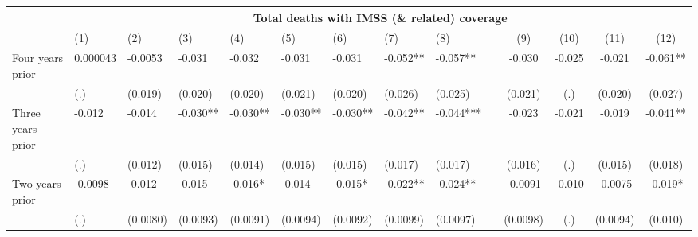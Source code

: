 \begin{tabular}{lccccrrrrrcccc}
\toprule
      & \multicolumn{13}{c}{Total deaths with IMSS (\& related) coverage } \\
\midrule
      & \multicolumn{1}{l}{(1)} & \multicolumn{1}{l}{(2)} & \multicolumn{1}{l}{(3)} & \multicolumn{1}{l}{(4)} & \multicolumn{1}{l}{(5)} & \multicolumn{1}{l}{(6)} & \multicolumn{1}{l}{(7)} & \multicolumn{1}{l}{(8)} &       & (9)   & (10)  & (11)  & (12) \\
\midrule
\midrule
Four years prior & \multicolumn{1}{l}{0.000043} & \multicolumn{1}{l}{-0.0053} & \multicolumn{1}{l}{-0.031} & \multicolumn{1}{l}{-0.032} & \multicolumn{1}{l}{-0.031} & \multicolumn{1}{l}{-0.031} & \multicolumn{1}{l}{-0.052**} & \multicolumn{1}{l}{-0.057**} &       & -0.030 & -0.025 & -0.021 & -0.061** \\
      & \multicolumn{1}{l}{(.)} & \multicolumn{1}{l}{(0.019)} & \multicolumn{1}{l}{(0.020)} & \multicolumn{1}{l}{(0.020)} & \multicolumn{1}{l}{(0.021)} & \multicolumn{1}{l}{(0.020)} & \multicolumn{1}{l}{(0.026)} & \multicolumn{1}{l}{(0.025)} &       & (0.021) & (.)   & (0.020) & (0.027) \\
Three years prior & \multicolumn{1}{l}{-0.012} & \multicolumn{1}{l}{-0.014} & \multicolumn{1}{l}{-0.030**} & \multicolumn{1}{l}{-0.030**} & \multicolumn{1}{l}{-0.030**} & \multicolumn{1}{l}{-0.030**} & \multicolumn{1}{l}{-0.042**} & \multicolumn{1}{l}{-0.044***} &       & -0.023 & -0.021 & -0.019 & -0.041** \\
      & \multicolumn{1}{l}{(.)} & \multicolumn{1}{l}{(0.012)} & \multicolumn{1}{l}{(0.015)} & \multicolumn{1}{l}{(0.014)} & \multicolumn{1}{l}{(0.015)} & \multicolumn{1}{l}{(0.015)} & \multicolumn{1}{l}{(0.017)} & \multicolumn{1}{l}{(0.017)} &       & (0.016) & (.)   & (0.015) & (0.018) \\
Two years prior & \multicolumn{1}{l}{-0.0098} & \multicolumn{1}{l}{-0.012} & \multicolumn{1}{l}{-0.015} & \multicolumn{1}{l}{-0.016*} & \multicolumn{1}{l}{-0.014} & \multicolumn{1}{l}{-0.015*} & \multicolumn{1}{l}{-0.022**} & \multicolumn{1}{l}{-0.024**} &       & -0.0091 & -0.010 & -0.0075 & -0.019* \\
      & \multicolumn{1}{l}{(.)} & \multicolumn{1}{l}{(0.0080)} & \multicolumn{1}{l}{(0.0093)} & \multicolumn{1}{l}{(0.0091)} & \multicolumn{1}{l}{(0.0094)} & \multicolumn{1}{l}{(0.0092)} & \multicolumn{1}{l}{(0.0099)} & \multicolumn{1}{l}{(0.0097)} &       & (0.0098) & (.)   & (0.0094) & (0.010) \\

\end{tabular}
